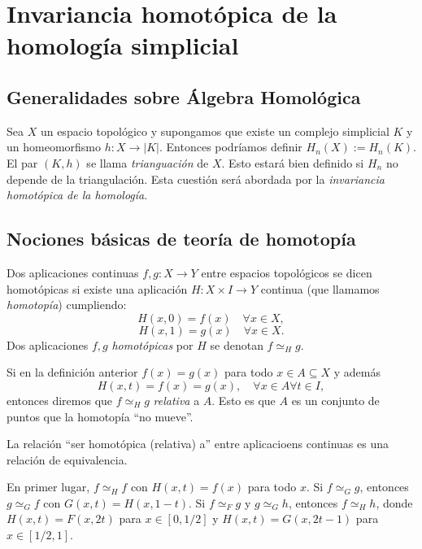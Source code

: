 \documentclass[HS.tex]{subfiles}
\begin{document}
\chapter{Invariancia homotópica de la homología simplicial}

\section{Generalidades sobre Álgebra Homológica}
Sea $X$ un espacio topológico y supongamos que existe un complejo simplicial $K$ y un homeomorfismo $h \colon X \to |K|$.
Entonces podríamos definir $H_n(X) := H_n(K)$.
El par $(K,h)$ se llama \emph{trianguación} de $X$.
Esto estará bien definido si $H_n$ no depende de la triangulación.
Esta cuestión será abordada por la \emph{invariancia homotópica de la homología}.

\section{Nociones básicas de teoría de homotopía}
\begin{defi}
Dos aplicaciones continuas $f,g \colon X \to Y$ entre espacios topológicos se dicen homotópicas si existe una aplicación $H \colon X \times I \to Y$ continua (que llamamos \emph{homotopía}) cumpliendo:
\[ H(x,0) = f(x) \quad \forall x \in X, \]
\[ H(x,1) = g(x) \quad \forall x \in X. \]
Dos aplicaciones $f,g$ \emph{homotópicas} por $H$ se denotan $f \simeq_H g$. 
\end{defi}

\begin{defi}
Si en la definición anterior $f(x) = g(x)$ para todo $x \in A \subseteq X$ y además
\[ H(x,t) = f(x) = g(x),\quad \forall x \in A \forall t \in I, \]
entonces diremos que $f \simeq_H g$ \emph{relativa} a $A$.
Esto es que $A$ es un conjunto de puntos que la homotopía ``no mueve''.
\end{defi}

\begin{prop}
La relación ``ser homotópica (relativa) a'' entre aplicacioens continuas es una relación de equivalencia.
\end{prop}
\begin{dem}
En primer lugar, $f\simeq_H f$ con $H(x,t)=f(x)$ para todo $x$. Si $f\simeq_G g$, entonces $g\simeq_G f$ con $G(x,t)=H(x,1-t)$. Si $f\simeq_F g$ y $g\simeq_G h$, entonces $f\simeq_H h$, donde $H(x,t)=F(x,2t)$ para  $x\in [0,1/2]$ y $H(x,t)=G(x,2t-1)$ para $x\in [1/2,1]$.\QED
\end{dem}
\end{document}
